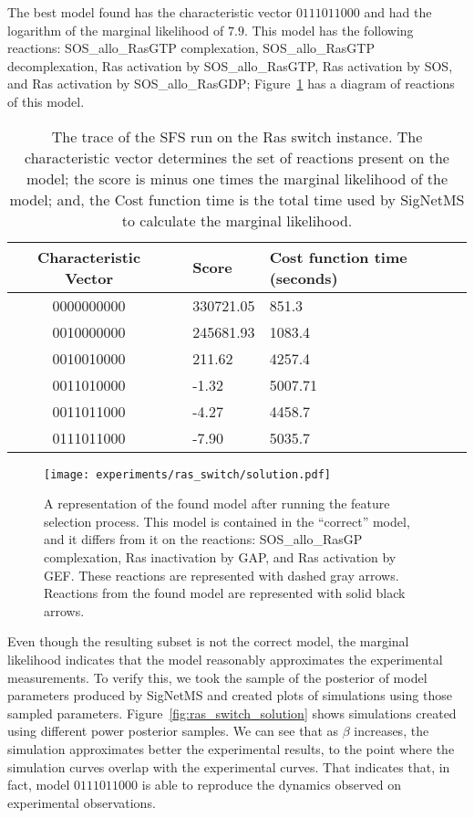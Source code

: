 The best model found has the characteristic vector $0111011000$ and had 
the logarithm of the marginal likelihood of $7.9$. This model has the 
following reactions: SOS\_allo\_RasGTP complexation, SOS\_allo\_RasGTP
decomplexation, Ras activation by SOS\_allo\_RasGTP, Ras activation
by SOS, and Ras activation by SOS\_allo\_RasGDP;
Figure~\ref{fig:ras_switch:found_model} has a diagram of reactions of
this model.


\begin{table}[H]
\centering
\begin{tabular}{c|cll}
\hline
Characteristic Vector && \multicolumn{1}{l}{Score} &
\multicolumn{1}{l}{Cost function time (seconds)} \\
\hline
    0000000000 && 330721.05	& 851.3	    \\
    0010000000 && 245681.93	& 1083.4	\\
    0010010000 && 211.62	& 4257.4	\\
    0011010000 && -1.32	    & 5007.71	\\
    0011011000 && -4.27	    & 4458.7	\\  
    0111011000 && -7.90	    & 5035.7	\\  
\hline
\hline
\end{tabular}
\caption{The trace of the SFS run on the Ras switch instance. The
    characteristic vector determines the set of reactions present on the
    model; the score is minus one times the marginal likelihood of
    the model; and, the Cost function time is the total time used by 
    SigNetMS to calculate the marginal likelihood.}
\label{tab:sfs_trace}
\end{table}

\begin{figure}[H]
\begin{center}
\texttt{[image: experiments/ras\_switch/solution.pdf]}
\caption{A representation of the found model after running the feature
    selection process. This model is contained in the ``correct'' model,
    and it differs from it on the reactions: SOS\_allo\_RasGP
    complexation, Ras inactivation by GAP, and Ras activation by GEF.
    These reactions are represented with dashed gray arrows. Reactions
    from the found model are represented with solid black arrows.
}
\label{fig:ras_switch:found_model}
\end{center}
\end{figure}

Even though the resulting subset is not the correct model, the marginal
likelihood indicates that the model reasonably approximates the
experimental measurements. To verify this, we took the sample of the
posterior of model parameters produced by SigNetMS and created plots of 
simulations using those sampled parameters.
Figure~\ref{fig:ras_switch_solution} shows simulations created using
different power posterior samples. We can see that as $\beta$ increases,
the simulation approximates better the experimental results, to the
point where the simulation curves overlap with the experimental curves.
That indicates that, in fact, model $0111011000$ is able to reproduce
the dynamics observed on experimental observations.


